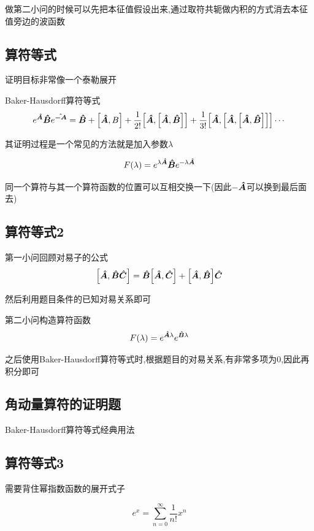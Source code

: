             做第二小问的时候可以先把本征值假设出来,通过取符共轭做内积的方式消去本征值旁边的波函数

        \subsection{算符等式}
            \begin{formal}
                证明目标非常像一个泰勒展开

                Baker-Hausdorff算符等式
                $$ e^{\vu*{A}} \vu*{B} e^{\vu*{-A}} = \vu*{B} + \comm{\vu*{A}}{B} + \frac{1}{2!} \comm{\vu*{A}}{\comm{\vu*{A}}{\vu*{B}}} + \frac{1}{3!} \comm{\vu*{A}}{\comm{\vu*{A}}{\comm{\vu*{A}}{\vu*{B}}}} \cdots $$

                其证明过程是一个常见的方法就是加入参数$\lambda$ 

                $$ F(\lambda) = e^{\lambda \vu*{A}} \vu*{B} e^{-\lambda \vu*{A}} $$

                同一个算符与其一个算符函数的位置可以互相交换一下(因此$-\vu*{A}$可以换到最后面去)
            \end{formal}

        \subsection{算符等式2}
            第一小问回顾对易子的公式
            $$ \comm{\vu*{A}}{\vu*{B}\vu*{C}} = \vu*{B} \comm{\vu*{A}}{\vu*{C}} + \comm{\vu*{A}}{\vu*{B}}\vu*{C} $$
        
            然后利用题目条件的已知对易关系即可

            第二小问构造算符函数
            $$ F(\lambda) = e^{\vu*{A} \lambda} e^{\vu*{B} \lambda} $$

            之后使用Baker-Hausdorff算符等式时,根据题目的对易关系,有非常多项为0,因此再积分即可
        
        \subsection{角动量算符的证明题}
            Baker-Hausdorff算符等式经典用法

        \subsection{算符等式3}
            需要背住幂指数函数的展开式子
            \begin{formal}
                $$ e^{x} = \sum_{n=0}^{\infty} \frac{1}{n!} x^{n}  $$
            \end{formal}
        

